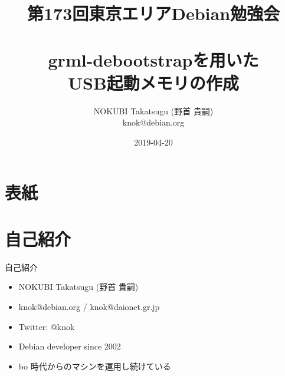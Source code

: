 \title{第173回東京エリアDebian勉強会 \\　\\grml-debootstrapを用いた \\USB起動メモリの作成}
\subtitle{}
\author{NOKUBI Takatsugu (野首 貴嗣) \\knok@debian.org}
\date{2019-04-20}



\section{表紙}

\begin{frame}
  \titlepage{}
\end{frame}


\section{自己紹介}

\begin{frame}{自己紹介}
  \begin{itemize}
  \item NOKUBI Takatsugu (野首 貴嗣)
  \item knok@debian.org / knok@daionet.gr.jp
  \item Twitter: @knok
  \item Debian developer since 2002
  \item bo 時代からのマシンを運用し続けている
  \end{itemize}
\end{frame}


